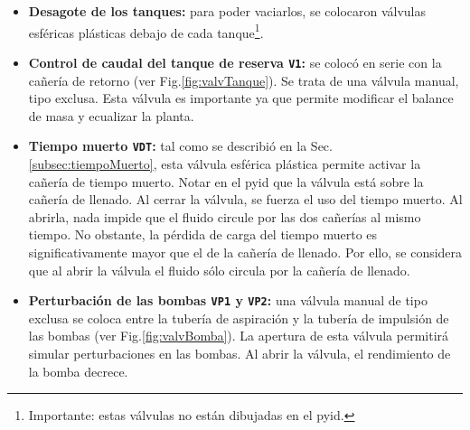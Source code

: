 \begin{itemize}
  \item \textbf{Desagote de los tanques:}
  para poder vaciarlos, se colocaron válvulas esféricas plásticas debajo de
cada tanque\footnote{Importante: estas válvulas no están dibujadas en el
\gls{pyid}.}.

  \item \textbf{Control de caudal del tanque de reserva \texttt{V1}:} se colocó
en serie
con la cañería de retorno (ver Fig.\ref{fig:valvTanque}). Se trata de una
válvula manual, tipo exclusa.
  Esta válvula es importante ya que permite modificar el balance de masa y
ecualizar la planta.

  \item \textbf{Tiempo muerto \texttt{VDT}:}
  tal como se describió en la Sec. \ref{subsec:tiempoMuerto}, esta válvula
esférica plástica permite activar la cañería de tiempo muerto.
  Notar en el \gls{pyid} que la válvula está sobre la cañería de llenado.
  Al cerrar la válvula, se fuerza el uso del tiempo muerto.
  Al abrirla, nada impide que el fluido circule por las dos cañerías al mismo
tiempo.
  No obstante, la pérdida de carga del tiempo muerto es significativamente
mayor que el de la cañería de llenado.
  Por ello, se considera que al abrir la válvula  el fluido sólo circula
por la cañería de llenado.

  \item \textbf{Perturbación de las bombas \texttt{VP1} y \texttt{VP2}:}
  una válvula manual de tipo exclusa se coloca entre la tubería de aspiración y
la tubería de impulsión de las bombas (ver Fig.\ref{fig:valvBomba}).
  La apertura de esta válvula permitirá simular perturbaciones en las
bombas.
 Al abrir la válvula, el rendimiento de la bomba decrece.
 \end{itemize}

